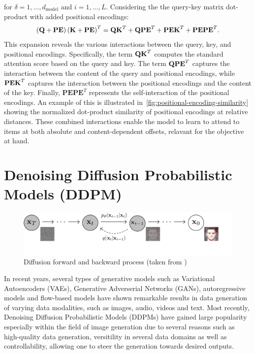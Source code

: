 for $\delta=1,\ldots,d_\text{model}$ and $i = 1,\ldots,L$. Considering the the query-key matrix dot-product with added positional encodings:
\begin{equation}
    \left(\vect{Q} + \textbf{PE} \right) \left( \vect{K} + \textbf{PE}  \right)^T = \vect{Q} \vect{K}^T+\vect{Q} \textbf{PE}^T+\textbf{PEK}^T+\textbf{PEPE}^T. %
\end{equation}
This expansion reveals the various interactions between the query, key, and positional encodings. Specifically, the term $\boldsymbol{\mathbf{Q}} \boldsymbol{\mathbf{K}}^T$ computes the standard attention score based on the query and key. The term $\boldsymbol{\mathbf{Q}} \textbf{PE}^T$ captures the interaction between the content of the query and positional encodings, while $\textbf{PE} \boldsymbol{\mathbf{K}}^T$ captures the interaction between the positional encodings and the content of the key. Finally, $\textbf{PE} \textbf{PE}^T$ represents the self-interaction of the positional encodings. An example of this is illustrated in~\cref{fig:positional-encoding-similarity} showing the normalized dot-product similarity of positional encodings at relative distances. These combined interactions enable the model to learn to attend to items at both absolute and content-dependent offsets, relavant for the objective at hand. 

\section{Denoising Diffusion Probabilistic Models (DDPM)}
\begin{figure}[H]
    \centering
    \includegraphics[width=\linewidth]{figures/pgm_diagram_xarrow_small.pdf}
    \caption{Diffusion forward and backward process (taken from \cite{ho2020denoising})}
    \label{fig:diffusion-process}
\end{figure}
In recent years, several types of generative models such as Variational Autoencoders (VAEs), Generative Adverserial Networks (GANs), autoregressive models and flow-based models have shown remarkable results in data generation of varying data modalities, such as images, audio, videos and text. Most recently, Denoising Diffusion Probabilistic Models (DDPMs) have gained large popularity especially within the field of image generation due to several reasons such as high-quality data generation, versitility in several data domains as well as controllability, allowing one to steer the generation towards desired outputs.

